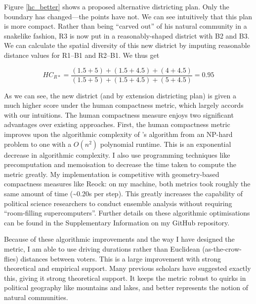 \documentclass[]{article}
\begin{document}
Figure \ref{hc_better} shows a proposed alternative districting plan.
Only the boundary has changed---the points have not. We can see
intuitively that this plan is more compact. Rather than being ``carved
out'' of his natural community in a snakelike fashion, R3 is now put in
a reasonably-shaped district with B2 and B3. We can calculate the
spatial diversity of this new district by imputing reasonable distance
values for R1--B1 and R2--B1. We thus get

\[HC_{R*} = \frac{(1.5 + 5) + (1.5+4.5) + (4 + 4.5)}{(1.5+5) + (1.5+4.5) + (5+4.5)} = 0.95\]

As we can see, the new district (and by extension districting plan) is
given a much higher score under the human compactness metric, which
largely accords with our intuitions. The human compactness measure
enjoys two significant advantages over existing approaches. First, the
human compactness metric improves upon the algorithmic complexity of
\citeauthor{fh2011}'s algorithm from an NP-hard problem to one with a
\(O(n^2)\) polynomial runtime. This is an exponential decrease in
algorithmic complexity. I also use programming techniques like
precomputation and memoisation to decrease the time taken to compute the
metric greatly. My implementation is competitive with geometry-based
compactness measures like Reock: on my machine, both metrics took
roughly the same amount of time (\textasciitilde{}0.20s per step). This
greatly increases the capability of political science researchers to
conduct ensemble analysis without requiring ``room-filling
supercomputers''. Further details on these algorithmic optimisations can
be found in the Supplementary Information on my GitHub repository.

Because of these algorithmic improvements and the way I have designed
the metric, I am able to use driving durations rather than Euclidean
(as-the-crow-flies) distances between voters. This is a large
improvement with strong theoretical and empirical support. Many previous
scholars have suggested exactly this, giving it strong theoretical
support. It keeps the metric robust to quirks in political geography
like mountains and lakes, and better represents the notion of natural
communities.
\end{document}

